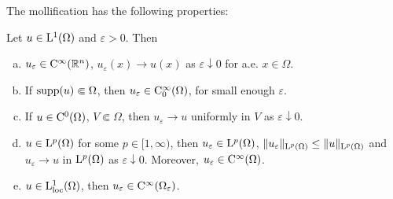 The mollification has the following properties:
\begin{thm}
  \label{thm:mollifier}
  Let $u \in \mathrm{L}^1(\Omega)$ and $\varepsilon > 0$. Then
  \begin{enumerate}[a)]
    \item $u_\varepsilon \in \mathrm{C}^\infty(\mathbb{R}^n)$, $u_\varepsilon(x) \to u(x)$ as $\varepsilon \downarrow 0$ for a.e. $x \in \Omega$.
    \item If $\operatorname{supp}(u) \Subset \Omega$, then $u_\varepsilon \in \mathrm{C}_0^\infty(\Omega)$, for small enough $\varepsilon$. 
    \item If $u \in \mathrm{C}^0(\Omega)$, $V \Subset \Omega$, then $u_\varepsilon \to u$ uniformly in $V$ as $\varepsilon \downarrow 0$.
    \item $u \in \mathrm{L}^p(\Omega)$ for some $p \in [1,\infty)$, then $u_\varepsilon \in \mathrm{L}^p(\Omega)$, $\|u_\varepsilon\|_{\mathrm{L}^p(\Omega)} \leq \|u\|_{\mathrm{L}^p(\Omega)}$ and $u_\varepsilon \to u$ in $\mathrm{L}^p(\Omega)$ as $\varepsilon \downarrow 0$.
      Moreover, $u_\varepsilon \in \mathrm{C}^\infty(\Omega)$.
      \item $u \in \mathrm{L}_{\operatorname{loc}}^1(\Omega)$, then $u_\varepsilon \in \mathrm{C}^\infty(\Omega_\varepsilon)$.
  \end{enumerate}
  \label{thm:mollification}
\end{thm}

